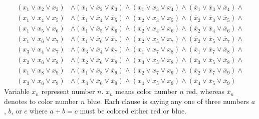 \documentclass[12pt]{article}
\theoremstyle{definition}
\begin{document}
\begin{align*}
(x_1 \vee x_2 \vee x_3 ) &\wedge ( \overline{x}_1 \vee \overline{x}_2 \vee \overline{x}_3 ) \wedge (x_1 \vee x_3 \vee x_4 ) \wedge ( \overline{x}_1 \vee \overline{x}_3 \vee \overline{x}_4 ) \wedge \\
(x_1 \vee x_4 \vee x_5 ) &\wedge ( \overline{x}_1 \vee \overline{x}_4 \vee \overline{x}_5 ) \wedge (x_2 \vee x_3 \vee x_5 ) \wedge ( \overline{x}_2 \vee \overline{x}_3 \vee \overline{x}_5 ) \wedge \\
(x_1 \vee x_5 \vee x_6 ) &\wedge ( \overline{x}_1 \vee \overline{x}_5 \vee \overline{x}_6 ) \wedge (x_2 \vee x_4 \vee x_6 ) \wedge ( \overline{x}_2 \vee \overline{x}_4 \vee \overline{x}_6 ) \wedge \\
(x_1 \vee x_6 \vee x_7 ) &\wedge ( \overline{x}_1 \vee \overline{x}_6 \vee \overline{x}_7 ) \wedge (x_2 \vee x_5 \vee x_7 ) \wedge ( \overline{x}_2 \vee \overline{x}_5 \vee \overline{x}_7 ) \wedge \\
(x_3 \vee x_4 \vee x_7 ) &\wedge ( \overline{x}_3 \vee \overline{x}_4 \vee \overline{x}_7 ) \wedge (x_1 \vee x_7 \vee x_8 ) \wedge ( \overline{x}_1 \vee \overline{x}_7 \vee \overline{x}_8 ) \wedge \\
(x_2 \vee x_6 \vee x_8 ) &\wedge ( \overline{x}_2 \vee \overline{x}_6 \vee \overline{x}_8 ) \wedge (x_3 \vee x_5 \vee x_8 ) \wedge ( \overline{x}_3 \vee \overline{x}_5 \vee \overline{x}_8 ) \wedge \\
(x_1 \vee x_8 \vee x_9 ) &\wedge ( \overline{x}_1 \vee \overline{x}_8 \vee \overline{x}_9 ) \wedge (x_2 \vee x_7 \vee x_9 ) \wedge ( \overline{x}_2 \vee \overline{x}_7 \vee \overline{x}_9 ) \wedge \\
(x_3 \vee x_6 \vee x_9 ) &\wedge ( \overline{x}_3 \vee \overline{x}_6 \vee \overline{x}_9 ) \wedge (x_4 \vee x_5 \vee x_9 ) \wedge ( \overline{x}_4 \vee \overline{x}_5 \vee \overline{x}_9 )
\end{align*}
Variable $x_n$ represent number $n$. $x_n$ means color number $n$ red, whereas $\overline{x}_n$ denotes to color number $n$ blue. Each clause is saying any one of three numbers $a$, $b$, or $c$ where $a + b = c$ must be colored either red or blue. \par
\end{document}
